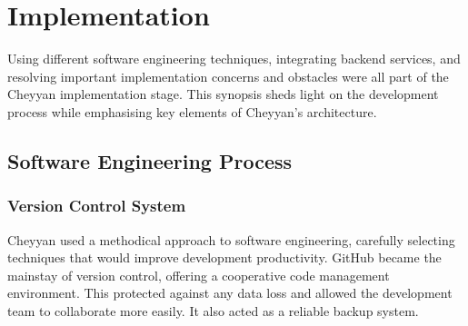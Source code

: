\documentclass{l4proj}
\begin{document}
















\chapter{Implementation}
Using different software engineering techniques, integrating backend services, and resolving
important implementation concerns and obstacles were all part of the Cheyyan implementation
stage. This synopsis sheds light on the development process while emphasising key elements of
Cheyyan’s architecture.

\section{Software Engineering Process}
\subsection{Version Control System}
Cheyyan used a methodical approach to software engineering, carefully selecting techniques that would improve development productivity. GitHub became the mainstay of version control, offering a cooperative code management environment. This protected against any data loss and allowed the development team to collaborate more easily. It also acted as a reliable backup system.
\end{document}
